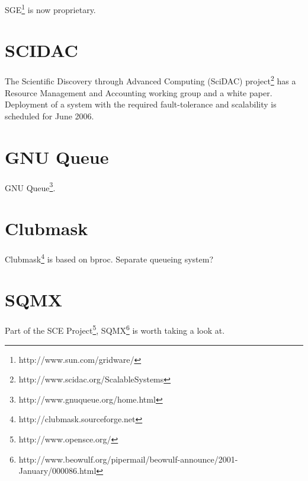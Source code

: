 \documentclass{article}
\begin{document}
SGE\footnote{http://www.sun.com/gridware/} is now proprietary.


\section{SCIDAC}

The Scientific Discovery through Advanced Computing (SciDAC) 
project\footnote{http://www.scidac.org/ScalableSystems}
has a Resource Management and Accounting working group
and a white paper\cite{Res2000}. Deployment of a system with 
the required fault-tolerance and scalability is scheduled 
for June 2006.

\section{GNU Queue}

GNU Queue\footnote{http://www.gnuqueue.org/home.html}.

\section{Clubmask}
Clubmask\footnote{http://clubmask.sourceforge.net} is based on bproc.
Separate queueing system?

\section{SQMX}
Part of the SCE Project\footnote{http://www.opensce.org/}, 
SQMX\footnote{http://www.beowulf.org/pipermail/beowulf-announce/2001-January/000086.html} is worth taking a look at.
                                                                                
\newpage


\end{document}
